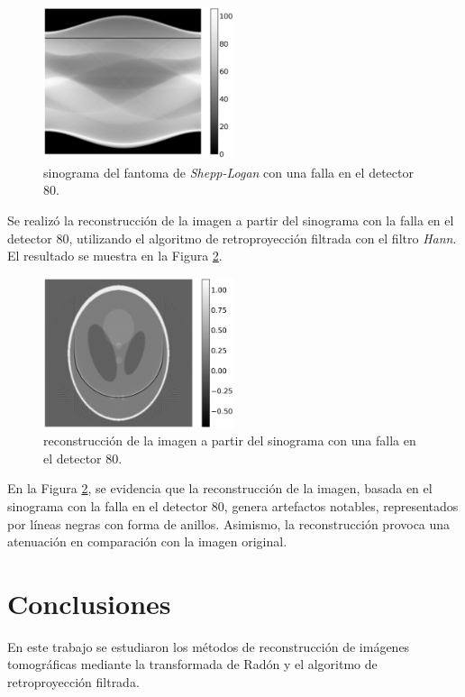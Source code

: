 \documentclass[11pt, twocolumn]{article}
\begin{document}
\begin{figure} [htbp]
    \centering
    \includegraphics[width=0.5\textwidth]{images/ej_7/sinogram_line.png}
    \caption{sinograma del fantoma de \textit{Shepp-Logan} con una falla en el detector 80.}
    \label{fig:sinograma_falla}
\end{figure}

Se realizó la reconstrucción de la imagen a partir del sinograma con la falla en el detector 80, utilizando el algoritmo de retroproyección filtrada con el filtro \textit{Hann}. El resultado se muestra en la Figura \ref{fig:reconstruccion_falla}.

\begin{figure} [H]
    \centering
    \includegraphics[width=0.5\textwidth]{images/ej_7/reconstruction_line.png}
    \caption{reconstrucción de la imagen a partir del sinograma con una falla en el detector 80.}
    \label{fig:reconstruccion_falla}
\end{figure}

En la Figura \ref{fig:reconstruccion_falla}, se evidencia que la reconstrucción de la imagen, basada en el sinograma con la falla en el detector 80, genera artefactos notables, representados por líneas negras con forma de anillos. Asimismo, la reconstrucción provoca una atenuación en comparación con la imagen original.

\section{Conclusiones}
En este trabajo se estudiaron los métodos de reconstrucción de imágenes tomográficas mediante la transformada de Radón y el algoritmo de retroproyección filtrada. 
\end{document}
